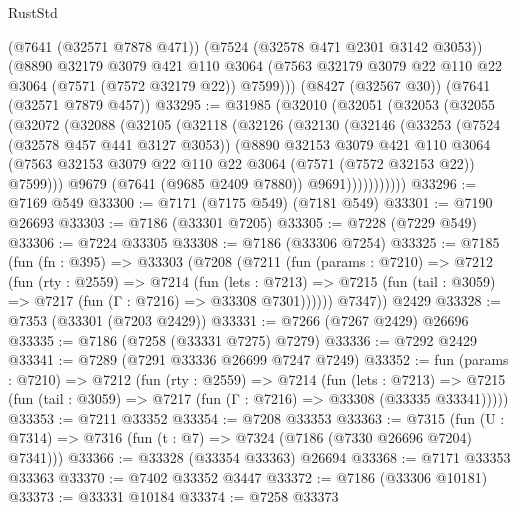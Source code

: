 \begin{lexlean}{RustStd}
\begin{coremodule}
{\begin{coremodule}
{{{{{{{{{{{{{{{{{{{{{{{{{{{{{{{{      (@7641 (@32571 @7878 @471))
      (@7524 (@32578 @471 @2301 @3142 @3053))
      (@8890
        @32179
        @3079
        @421
        @110
        @3064
        (@7563 @32179 @3079 @22 @110 @22 @3064 (@7571 (@7572 @32179 @22)) @7599)))
    (@8427 (@32567 @30))
    (@7641 (@32571 @7879 @457))
@33295 := @31985
    (@32010
      (@32051
        (@32053
          (@32055
            (@32072
              (@32088
                (@32105
                  (@32118
                    (@32126
                      (@32130
                        (@32146
                          (@33253
                            (@7524 (@32578 @457 @441 @3127 @3053))
                            (@8890
                              @32153
                              @3079
                              @421
                              @110
                              @3064
                              (@7563
                                @32153
                                @3079
                                @22
                                @110
                                @22
                                @3064
                                (@7571 (@7572 @32153 @22))
                                @7599)))
                          @9679
                          (@7641 (@9685 @2409 @7880))
                          @9691)))))))))))
@33296 := @7169 @549
@33300 := @7171 (@7175 @549) (@7181 @549)
@33301 := @7190 @26693
@33303 := @7186 (@33301 @7205)
@33305 := @7228 (@7229 @549)
@33306 := @7224 @33305
@33308 := @7186 (@33306 @7254)
@33325 := @7185
    (fun (fn : @395) =>
    @33303
      (@7208
        (@7211
          (fun (params : @7210) =>
          @7212
            (fun (rty : @2559) =>
            @7214
              (fun (lets : @7213) =>
              @7215 (fun (tail : @3059) => @7217 (fun (Γ : @7216) => @33308 @7301))))))
        @7347))
    @2429
@33328 := @7353 (@33301 (@7203 @2429))
@33331 := @7266 (@7267 @2429) @26696
@33335 := @7186 (@7258 (@33331 @7275) @7279)
@33336 := @7292 @2429
@33341 := @7289 (@7291 @33336 @26699 @7247 @7249)
@33352 := fun (params : @7210) =>
  @7212
    (fun (rty : @2559) =>
    @7214
      (fun (lets : @7213) =>
      @7215 (fun (tail : @3059) => @7217 (fun (Γ : @7216) => @33308 (@33335 @33341)))))
@33353 := @7211 @33352
@33354 := @7208 @33353
@33363 := @7315
    (fun (U : @7314) => @7316 (fun (t : @7) => @7324 (@7186 (@7330 @26696 @7204) @7341)))
@33366 := @33328 (@33354 @33363) @26694
@33368 := @7171 @33353 @33363
@33370 := @7402 @33352 @3447
@33372 := @7186 (@33306 @10181)
@33373 := @33331 @10184
@33374 := @7258 @33373
}}}}}}}}}}}}}}}}}}}}}}}}}}}}}}}}
\end{coremodule}}
\end{coremodule}
\end{lexlean}
